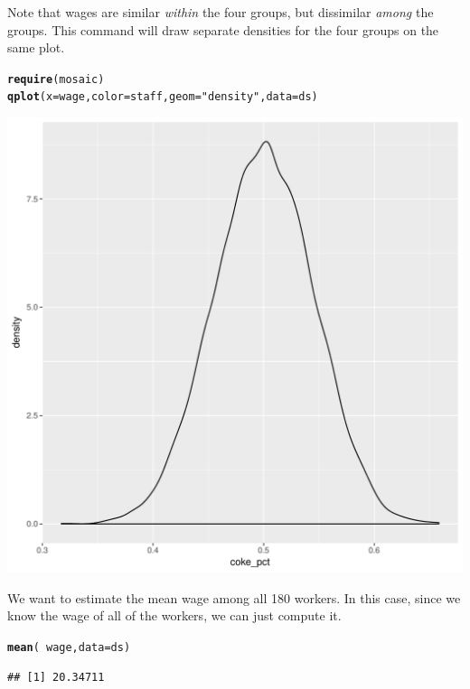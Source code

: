\documentclass[10pt]{article}\usepackage[]{graphicx}\usepackage[]{color}
\makeatletter
\def\maxwidth{ %
  \ifdim\Gin@nat@width>\linewidth
    \linewidth
  \else
    \Gin@nat@width
  \fi
}
\newcommand{\hlstr}[1]{\textcolor[rgb]{0.192,0.494,0.8}{#1}}%
\newcommand{\hlopt}[1]{\textcolor[rgb]{0,0,0}{#1}}%
\newcommand{\hlstd}[1]{\textcolor[rgb]{0.345,0.345,0.345}{#1}}%
\newcommand{\hlkwc}[1]{\textcolor[rgb]{0.333,0.667,0.333}{#1}}%
\newcommand{\hlkwd}[1]{\textcolor[rgb]{0.737,0.353,0.396}{\textbf{#1}}}%
\newenvironment{kframe}{%
 \def\at@end@of@kframe{}%
 \ifinner\ifhmode%
  \def\at@end@of@kframe{\end{minipage}}%
  \begin{minipage}{\columnwidth}%
 \fi\fi%
 \def\FrameCommand##1{\hskip\@totalleftmargin \hskip-\fboxsep
 \colorbox{shadecolor}{##1}\hskip-\fboxsep
     \hskip-\linewidth \hskip-\@totalleftmargin \hskip\columnwidth}%
 \MakeFramed {\advance\hsize-\width
   \@totalleftmargin\z@ \linewidth\hsize
   \@setminipage}}%
 {\par\unskip\endMakeFramed%
 \at@end@of@kframe}
\newenvironment{knitrout}{}{} %
\makeatother
\begin{document}
Note that wages are similar \emph{within} the four groups, but dissimilar \emph{among} the groups. This command will draw separate densities for the four groups on the same plot. 

\begin{knitrout}
\color{fgcolor}\begin{kframe}
\begin{alltt}
\hlkwd{require}\hlstd{(mosaic)}
\hlkwd{qplot}\hlstd{(}\hlkwc{x} \hlstd{= wage,} \hlkwc{color} \hlstd{= staff,} \hlkwc{geom} \hlstd{=} \hlstr{"density"}\hlstd{,} \hlkwc{data} \hlstd{= ds)}
\end{alltt}
\end{kframe}

{\centering \includegraphics[width=\maxwidth]{figure/unnamed-chunk-2-1} 

}



\end{knitrout}

We want to estimate the mean wage among all 180 workers. In this case, since we know the wage of all of the workers, we can just compute it. 
  
\begin{knitrout}
\color{fgcolor}\begin{kframe}
\begin{alltt}
\hlkwd{mean}\hlstd{(}\hlopt{~}\hlstd{wage,} \hlkwc{data} \hlstd{= ds)}
\end{alltt}
\begin{verbatim}
## [1] 20.34711
\end{verbatim}
\end{kframe}
\end{knitrout}
  
\end{document}
